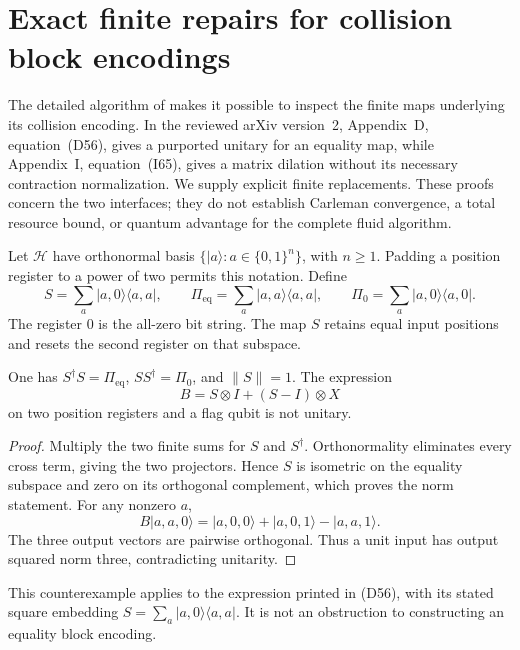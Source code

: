 \section{Exact finite repairs for collision block encodings}
\label{sec:fluid-circuit-repairs}

The detailed algorithm of \citet{NSJennings2026} makes it possible to inspect the finite maps underlying its collision encoding. In the reviewed arXiv version~2, Appendix~D, equation~(D56), gives a purported unitary for an equality map, while Appendix~I, equation~(I65), gives a matrix dilation without its necessary contraction normalization. We supply explicit finite replacements. These proofs concern the two interfaces; they do not establish Carleman convergence, a total resource bound, or quantum advantage for the complete fluid algorithm.

Let $\mathcal H$ have orthonormal basis $\{|a\rangle:a\in\{0,1\}^n\}$, with $n\ge1$. Padding a position register to a power of two permits this notation. Define
\[
 S=\sum_a|a,0\rangle\langle a,a|,\qquad
 \Pi_{\mathrm{eq}}=\sum_a|a,a\rangle\langle a,a|,\qquad
 \Pi_0=\sum_a|a,0\rangle\langle a,0|.
\]
The register $0$ is the all-zero bit string. The map $S$ retains equal input positions and resets the second register on that subspace.

\begin{proposition}
\label{prop:fluid-equality-partial-isometry}
One has $S^\dagger S=\Pi_{\mathrm{eq}}$, $SS^\dagger=\Pi_0$, and $\|S\|=1$. The expression
\[
 B=S\otimes I+(S-I)\otimes X
\]
on two position registers and a flag qubit is not unitary.
\end{proposition}
\begin{proof}
Multiply the two finite sums for $S$ and $S^\dagger$. Orthonormality eliminates every cross term, giving the two projectors. Hence $S$ is isometric on the equality subspace and zero on its orthogonal complement, which proves the norm statement. For any nonzero $a$,
\[
 B|a,a,0\rangle
 =|a,0,0\rangle+|a,0,1\rangle-|a,a,1\rangle.
\]
The three output vectors are pairwise orthogonal. Thus a unit input has output squared norm three, contradicting unitarity.
\end{proof}

This counterexample applies to the expression printed in (D56), with its stated square embedding $S=\sum_a|a,0\rangle\langle a,a|$. It is not an obstruction to constructing an equality block encoding.

